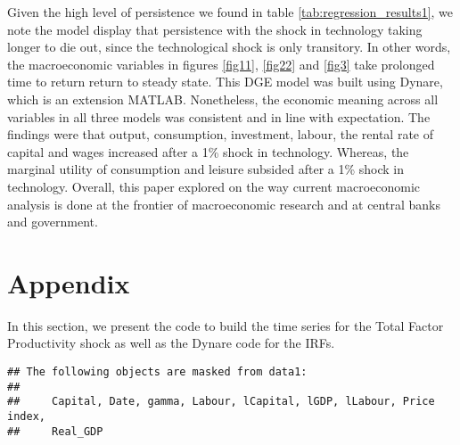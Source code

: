 \documentclass[
  11pt,
  justified]{article}
\begin{document}
Given the high level of persistence we found in table
\ref{tab:regression_results1}, we note the model display that
persistence with the shock in technology taking longer to die out, since
the technological shock is only transitory. In other words, the
macroeconomic variables in figures \ref{fig11}, \ref{fig22} and
\ref{fig3} take prolonged time to return return to steady state. This
DGE model was built using Dynare, which is an extension MATLAB.
Nonetheless, the economic meaning across all variables in all three
models was consistent and in line with expectation. The findings were
that output, consumption, investment, labour, the rental rate of capital
and wages increased after a 1\% shock in technology. Whereas, the
marginal utility of consumption and leisure subsided after a 1\% shock
in technology. Overall, this paper explored on the way current
macroeconomic analysis is done at the frontier of macroeconomic research
and at central banks and government.

\newpage

\hypertarget{appendix}{%
\section{Appendix}\label{appendix}}

In this section, we present the code to build the time series for the
Total Factor Productivity shock as well as the Dynare code for the IRFs.

\begin{verbatim}
## The following objects are masked from data1:
## 
##     Capital, Date, gamma, Labour, lCapital, lGDP, lLabour, Price index,
##     Real_GDP
\end{verbatim}
\end{document}
